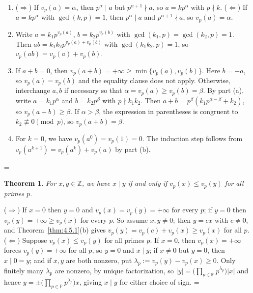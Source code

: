 \documentclass[11pt]{article}
\makeatletter
\let\nt@closedisplay\]
\def\nt@guardedclose{\@ifnextchar\par{\nt@closeafterpar}{\@ifnextchar\end{\postdisplaypenalty\@M\nt@closedisplay}{\nt@closedisplay}}}
\def\nt@closeafterpar\par{\@ifnextchar\par{\nt@closeafterpar}{\@ifnextchar\end{\postdisplaypenalty\@M\nt@closedisplay\par}{\nt@closedisplay\par}}}
\renewenvironment{proof}[1][\proofname]{\par
  \pushQED{\qed}\normalfont\topsep\medskipamount\edef\nt@afterproof{\@endparpenalty=\the\@endparpenalty\relax}\@beginparpenalty\@M\@endparpenalty\@M\let\]\nt@guardedclose\trivlist\item[]\textit{#1\@addpunct{.}} \ignorespaces}{\ifvmode\addpenalty\@M\fi\popQED\nt@afterproof\endtrivlist\@endpefalse}
\theoremstyle{ntstyle}
\newtheorem{theorem}{Theorem}[subsection]
\newcommand{\Primes}{\mathbb{P}}
\makeatother
\begin{document}
\begin{proof}

  \begin{enumerate}[label={\alph*)}]
    \item ($\Rightarrow$) If $v_p(a) = \alpha$, then $p^{\alpha} \mid a$ but $p^{\alpha+1} \nmid a$, so
    $a = k p^{\alpha}$ with $p \nmid k$. ($\Leftarrow$) If $a = k p^{\alpha}$ with $\gcd(k, p) = 1$, then
          $p^{\alpha} \mid a$ and $p^{\alpha+1} \nmid a$, so $v_p(a) = \alpha$.
    \item Write $a = k_1 p^{v_p(a)}$, $b = k_2 p^{v_p(b)}$ with
          $\gcd(k_1, p) = \gcd(k_2, p) = 1$. Then $ab = k_1 k_2 p^{v_p(a) + v_p(b)}$ with $\gcd(k_1 k_2, p) = 1$,
          so $v_p(ab) = v_p(a) + v_p(b)$.
    \item If $a+b=0$, then $v_p(a+b)=+\infty\ge\min\{v_p(a),v_p(b)\}$.
          Here $b=-a$, so $v_p(a)=v_p(b)$ and the equality clause does not apply.
          Otherwise, interchange $a,b$ if necessary so that
          $\alpha=v_p(a)\ge v_p(b)=\beta$. By part (a), write
          $a=k_1p^{\alpha}$ and $b=k_2p^{\beta}$ with $p\nmid k_1k_2$.
          Then $a+b=p^{\beta}(k_1p^{\alpha-\beta}+k_2)$, so
          $v_p(a+b)\ge\beta$. If $\alpha>\beta$, the expression in parentheses
          is congruent to $k_2\not\equiv0\pmod{p}$, so $v_p(a+b)=\beta$.
    \item For $k=0$, we have $v_p(a^0)=v_p(1)=0$.
          The induction step follows from
          $v_p(a^{k+1})=v_p(a^k)+v_p(a)$ by part (b).\qedhere
\end{enumerate}
\end{proof}

\begin{theorem}\label{thm:4.5.2} For $x, y \in \mathbb{Z}$, we have $x \mid y$ if and only if $v_p(x) \le v_p(y)$
  for all primes $p$.

\end{theorem}

\begin{proof} ($\Rightarrow$) If $x=0$ then $y=0$ and
  $v_p(x)=v_p(y)=+\infty$ for every $p$; if $y=0$ then
  $v_p(y)=+\infty\ge v_p(x)$ for every $p$. So assume $x,y\neq0$; then
  $y=cx$ with $c\neq0$, and Theorem~\ref{thm:4.5.1}(b) gives
  $v_p(y)=v_p(c)+v_p(x)\ge v_p(x)$ for all $p$.
  ($\Leftarrow$) Suppose $v_p(x) \le v_p(y)$ for all primes $p$. If $x = 0$, then $v_p(x) = +\infty$ forces
  $v_p(y) = +\infty$ for all $p$, so $y = 0$ and $x \mid y$; if $x \neq 0$ but $y = 0$, then $x \mid 0 = y$; and if
  $x,y$ are both nonzero, put $\lambda_p:=v_p(y)-v_p(x)\ge0$.
  Only finitely many $\lambda_p$ are nonzero, by unique factorization, so
  $|y| = \big(\prod_{p\in\Primes} p^{\lambda_p}\big)|x|$ and hence
  $y = \pm\big(\prod_{p\in\Primes} p^{\lambda_p}\big) x$, giving $x \mid y$ for either choice of sign.
\end{proof}
\end{document}
